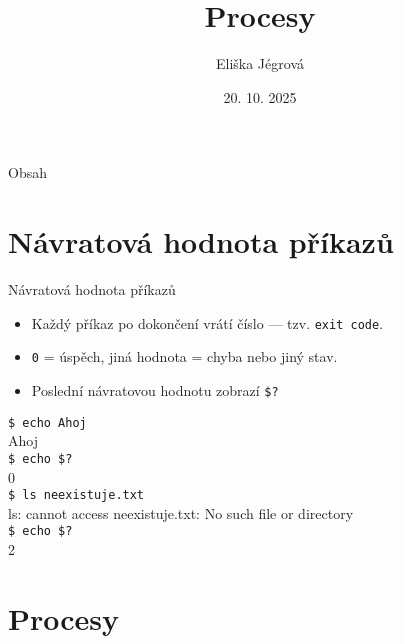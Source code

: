 \documentclass{beamer}
\title{Procesy}
\author{Eliška Jégrová}
\date{20. 10. 2025}
\begin{document}
	
	\frame{\titlepage}
	
	\begin{frame}{Obsah}
		\tableofcontents
	\end{frame}
	
	
	\section{Návratová hodnota příkazů}

\begin{frame}[fragile]{Návratová hodnota příkazů}
	\begin{itemize}
		\item Každý příkaz po dokončení vrátí číslo — tzv. \texttt{exit code}.
		\item \texttt{0} = úspěch, jiná hodnota = chyba nebo jiný stav.
		\item Poslední návratovou hodnotu zobrazí \texttt{\$?}
	\end{itemize}
	
	\vspace{0.5em}
	\hspace{2em}\texttt{\$ echo Ahoj} \\
	\hspace{2em}Ahoj \\
	\hspace{2em}\texttt{\$ echo \$?} \\
	\hspace{2em}0 \\[0.7em]
	
	\hspace{2em}\texttt{\$ ls neexistuje.txt} \\
	\hspace{2em}ls: cannot access \textquotesingle neexistuje.txt\textquotesingle: No such file or directory \\
	\hspace{2em}\texttt{\$ echo \$?} \\
	\hspace{2em}2
\end{frame}

\section{Procesy}
\end{document}
